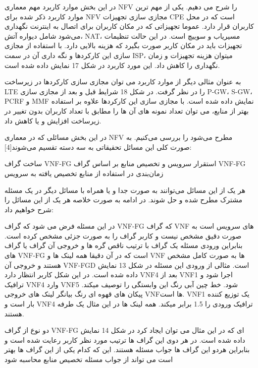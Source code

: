 
در این بخش موارد کاربرد مهم معماری NFV را شرح می دهیم. یکی از مهم ترین موارد کاربرد ذکر شده برای NFV مجازی سازی تجهیزات CPE است که در محل کاربران قرار دارد.
عموما تجهیزاتی که در مکان کاربران برای اتصال به اینترنت نگهداری می‌شود شامل دیواره آتش، NAT، مسیریاب و سوییچ است.
در این حالت تنظیمات تجهیزات باید در مکان کاربر صورت بگیرد که هزینه بالایی دارد. با استفاده از مجازی سازی این کارکردها و نگه داری آن در سمت ISP، میتوان هزینه تجهیزات و زمان نگهداری را کاهش داد. این مورد کاربرد در شکل 17 نمایش داده شده است.

 به عنوان مثالی دیگر از موارد کاربرد می توان مجازی سازی کارکردها در زیرساخت LTE را در نظر گرفت. در شکل 18 شرایط قبل و بعد از مجازی سازی P-GW، S-GW، PCRF و MMF نمایش داده شده است. با مجازی سازی این کارکردها علاوه بر استفاده بهتر از منابع، می توان تعداد نمونه های آن ها را مطابق با تعداد کاربران بدون تغییر در زیرساخت افزایش و یا کاهش داد.


در این بخش مسائلی که در معماری NFV مطرح می‌شود را بررسی می‌کنیم. به صورت کلی این مسائل تحقیقاتی به سه دسته تقسیم می‌شوند[4]:


 ساخت گراف VNF-FG
 استقرار سرویس و تخصیص منابع بر اساس گراف VNF-FG
 زمان‌بندی در استفاده از منابع تخصیص یافته به سرویس

هر یک از این مسائل می‌توانند به صورت جدا و یا همراه با مسائل دیگر در یک مسئله مشترک مطرح شده و حل شوند. در ادامه به صورت خلاصه هر یک از این مسائل را شرح خواهیم داد:


در این مسئله فرض می شود که گراف VNF-FG که گراف VNF های سرویس است به صورت دقیق مشخص نیست و کاربر گراف را به صورت جزئی مشخص کرده است. بنابراین ورودی مسئله یک گراف با ترتیب ناقص گره ها و خروجی آن گراف یا گراف های VNF-FG است که در آن دقیقا همه لینک ها و VNF ها به صورت کامل مشخص هستند و خروجی آن VNF-FGD است. مثالی از ورودی این مسئله در شکل 13 نمایش داده شده است. در این شکل کاربر انتظار دارد VNF4 بعد از VNF1 اجرا شود و ترافیک VNF4 وارد VNF5 شود. خط چین آبی رنگ این وابستگی را توصیف میکند. پیکان های قهوه ای رنگ بیانگر لینک های خروجی VNFها است. VNF1 یک توزیع کننده بار است و VNF4 ترافیک ورودی را 1.5 برابر میکند. همه لینک ها در این مثال یک طرفه هستند.

دو نوع از گراف VNF-FG ای که در این مثال می توان ایجاد کرد در شکل 14 نمایش داده شده است. در هر دوی این گراف ها ترتیب مورد نظر کاربر رعایت شده است و بنابراین هردو این گراف ها جواب مسئله هستند. این که کدام یکی از این گراف ها بهتر است می تواند از جواب مسئله تخصیص منابع محاسبه شود

